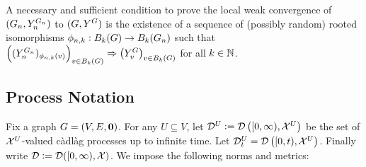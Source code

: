 \remark A necessary and sufficient condition to prove the local weak convergence of \((G_{n},Y^{G_{n}}_{n})\) to \((G,Y^{G})\) is the existence of a sequence of (possibly random) rooted isomorphisms \(\phi_{n,k}: B_{k}(G) \rightarrow B_{k}(G_{n})\) such that \(\left((Y^{G_{n}}_{n})_{\phi_{n,k}(v)}\right)_{v\in B_{k}(G)} \Rightarrow \left(Y^{G}_{v}\right)_{v \in B_{k}(G)}\) for all \(k\in\mathbb{N}\).



\subsection{Process Notation}
\label{not::p}

Fix a graph \(G = (V,E,\mathbf{0})\). For any \(U \subseteq V\), let \(\mathcal{D}^{U} := \mathcal{D}\left([0,\infty),\mathcal{X}^U\right)\) be the set of \(\mathcal{X}^U\)-valued c\`adl\`ag processes up to infinite time. Let \(\mathcal{D}^{U}_{t} = \mathcal{D}\left([0,t),\mathcal{X}^U\right)\). Finally write \(\mathcal{D} := \mathcal{D}([0,\infty),\mathcal{X})\). We impose the following norms and metrics:

